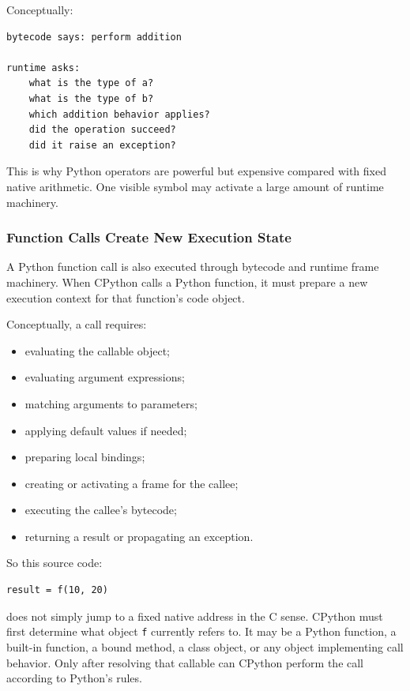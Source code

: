 Conceptually:

\begin{verbatim}
bytecode says: perform addition

runtime asks:
    what is the type of a?
    what is the type of b?
    which addition behavior applies?
    did the operation succeed?
    did it raise an exception?
\end{verbatim}

This is why Python operators are powerful but expensive compared with fixed native arithmetic. One visible symbol may activate a large amount of runtime machinery.

\subsubsection{Function Calls Create New Execution State}

A Python function call is also executed through bytecode and runtime frame machinery. When CPython calls a Python function, it must prepare a new execution context for that function's code object.

Conceptually, a call requires:

\begin{itemize}
    \item evaluating the callable object;
    \item evaluating argument expressions;
    \item matching arguments to parameters;
    \item applying default values if needed;
    \item preparing local bindings;
    \item creating or activating a frame for the callee;
    \item executing the callee's bytecode;
    \item returning a result or propagating an exception.
\end{itemize}

So this source code:

\begin{verbatim}
result = f(10, 20)
\end{verbatim}

does not simply jump to a fixed native address in the C sense. CPython must first determine what object \texttt{f} currently refers to. It may be a Python function, a built-in function, a bound method, a class object, or any object implementing call behavior. Only after resolving that callable can CPython perform the call according to Python's rules.


